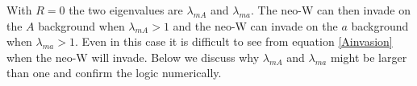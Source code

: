 \documentclass[12pt]{article}
\begin{document}
%
%



With $R=0$ the two eigenvalues are $\lambda_{mA}$ and $\lambda_{ma}$.
The neo-W can then invade on the $A$ background when $\lambda_{mA}>1$ and the neo-W can invade on the $a$ background when $\lambda_{ma}>1$.
Even in this case it is difficult to see from equation \ref{Ainvasion} when the neo-W will invade.
Below we discuss why $\lambda_{mA}$ and $\lambda_{ma}$ might be larger than one and confirm the logic numerically.
\end{document}
